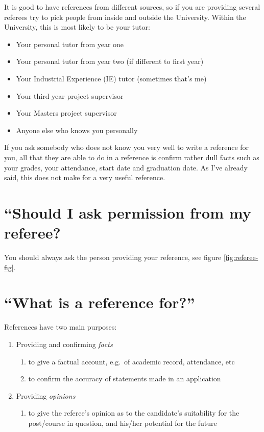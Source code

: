 \documentclass[
  12pt,
]{book}
\providecommand{\tightlist}{%
  \setlength{\itemsep}{0pt}\setlength{\parskip}{0pt}}
\begin{document}
It is good to have references from different sources, so if you are providing several referees try to pick people from inside and outside the University. Within the University, this is most likely to be your tutor:

\begin{itemize}
\tightlist
\item
  Your personal tutor from year one
\item
  Your personal tutor from year two (if different to first year)
\item
  Your Industrial Experience (IE) tutor (sometimes that's me)
\item
  Your third year project supervisor
\item
  Your Masters project supervisor
\item
  Anyone else who knows you personally
\end{itemize}

If you ask somebody who does not know you very well to write a reference for you, all that they are able to do in a reference is confirm rather dull facts such as your grades, your attendance, start date and graduation date. As I've already said, this does not make for a very useful reference.

\section{``Should I ask permission from my referee?}\label{permission}

You should always ask the person providing your reference, see figure \ref{fig:referee-fig}.

\section{``What is a reference for?''}\label{for}

References have two main purposes:

\begin{enumerate}
\def\labelenumi{\arabic{enumi}.}
\tightlist
\item
  Providing and confirming \emph{facts}

  \begin{enumerate}
  \def\labelenumii{\roman{enumii}.}
  \tightlist
  \item
    to give a factual account, e.g.~of academic record, attendance, etc
  \item
    to confirm the accuracy of statements made in an application
  \end{enumerate}
\item
  Providing \emph{opinions}

  \begin{enumerate}
  \def\labelenumii{\roman{enumii}.}
  \tightlist
  \item
    to give the referee's opinion as to the candidate's suitability for the post/course in
    question, and his/her potential for the future
  \end{enumerate}
\end{enumerate}
\end{document}
